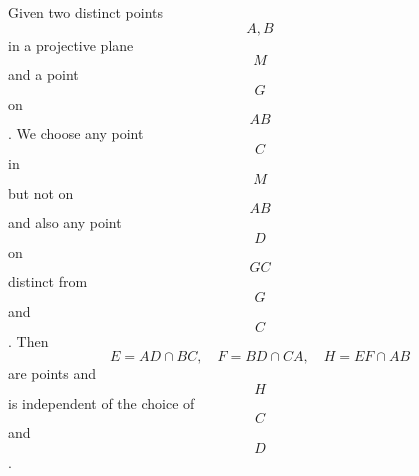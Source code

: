 Given two distinct points $$A, B$$ in a projective plane $$M$$ and a point $$G$$ on $$AB$$. We choose any point $$C$$ in $$M$$ but not on $$AB$$ and also any point $$D$$ on $$GC$$ distinct from $$G$$ and $$C$$. Then
$$E = AD \cap BC,\quad F = BD \cap CA,\quad H = EF \cap AB$$
are points and $$H$$ is independent of the choice of $$C$$ and $$D$$.
